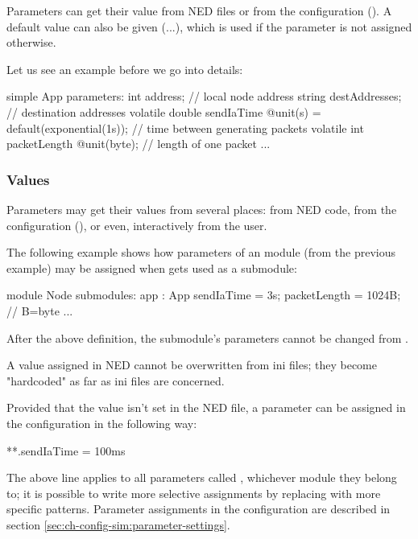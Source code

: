 Parameters can get their value from NED files or from the configuration
(). A default value can also be given (...\ttt{)}),
which is used if the parameter is not assigned otherwise.

Let us see an example before we go into details:

\begin{ned}
simple App
{
    parameters:
        int address;  // local node address
        string destAddresses;  // destination addresses
        volatile double sendIaTime @unit(s) = default(exponential(1s));
                               // time between generating packets
        volatile int packetLength @unit(byte);  // length of one packet
    ...
}
\end{ned}



\subsubsection{Values}

Parameters may get their values from several places: from NED code, from
the configuration (), or even, interactively from the
user.

The following example shows how parameters of an  module (from the
previous example) may be assigned when  gets used as a submodule:

\begin{ned}
module Node
{
    submodules:
        app : App {
            sendIaTime = 3s;
            packetLength = 1024B; // B=byte
        }
        ...
}
\end{ned}

After the above definition, the  submodule's parameters cannot
be changed from .

\begin{important}
    A value assigned in NED cannot be overwritten from ini files; they
    become "hardcoded" as far as ini files are concerned.
\end{important}

Provided that the value isn't set in the NED file, a parameter can be assigned
in the configuration in the following way:

\begin{inifile}
**.sendIaTime = 100ms
\end{inifile}

The above line applies to all parameters called , whichever
module they belong to; it is possible to write more selective assignments
by replacing \ttt{**} with more specific patterns. Parameter assignments in
the configuration are described in section
\ref{sec:ch-config-sim:parameter-settings}.

